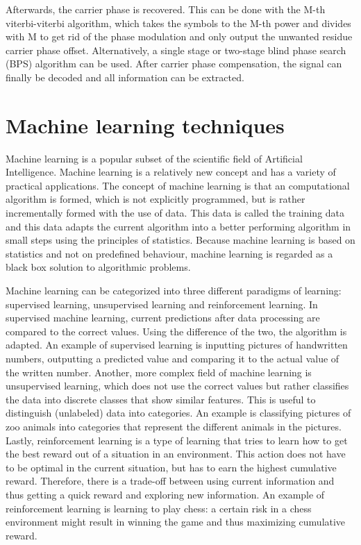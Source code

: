 \documentclass[journal,10pt,twoside, a4paper]{IEEEtran}
\begin{document}
Afterwards, the carrier phase is recovered. This can be done with the M-th viterbi-viterbi algorithm\cite{coherent_detection,viterbi}, which takes the symbols to the M-th power and divides with M to get rid of the phase modulation and only output the unwanted residue carrier phase offset. Alternatively, a single stage\cite{1stagebps} or two-stage\cite{2stagebps} blind phase search (BPS) algorithm can be used. After carrier phase compensation, the signal can finally be decoded and all information can be extracted.

\section{Machine learning techniques}
Machine learning is a popular subset of the scientific field of Artificial Intelligence. Machine learning is a relatively new concept and has a variety of practical applications. The concept of machine learning is that an computational algorithm is formed, which is not explicitly programmed, but is rather incrementally formed with the use of data. This data is called the training data and this data adapts the current algorithm into a better performing algorithm in small steps using the principles of statistics. Because machine learning is based on statistics and not on predefined behaviour, machine learning is regarded as a black box solution to algorithmic problems.

Machine learning can be categorized into three different paradigms of learning: supervised learning, unsupervised learning and reinforcement learning. In supervised machine learning, current predictions after data processing are compared to the correct values. Using the difference of the two, the algorithm is adapted. An example of supervised learning is inputting pictures of handwritten numbers, outputting a predicted value and comparing it to the actual value of the written number. Another, more complex field of machine learning is unsupervised learning, which does not use the correct values but rather classifies the data into discrete classes that show similar features. This is useful to distinguish (unlabeled) data into categories. An example is classifying pictures of zoo animals into categories that represent the different animals in the pictures. Lastly, reinforcement learning is a type of learning that tries to learn how to get the best reward out of a situation in an environment. This action does not have to be optimal in the current situation, but has to earn the highest cumulative reward. Therefore, there is a trade-off between using current information and thus getting a quick reward and exploring new information. An example of reinforcement learning is learning to play chess: a certain risk in a chess environment might result in winning the game and thus maximizing cumulative reward.
\end{document}
